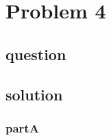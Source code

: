 \section{Problem 4}
\subsection{question}
\subsection{solution}
\pagebreak
\subsubsection{partA}

\pagebreak